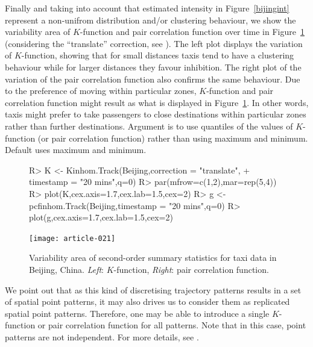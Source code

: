\documentclass[article]{jss}
\begin{document}
  
  Finally and taking into account that estimated intensity in Figure~\ref{bijingint} represent a non-unifrom distribution and/or clustering behaviour, we show the variability area of $K$-function and pair correlation function over time in Figure~\ref{Kgvariation} (considering the ``translate'' correction, see \cite{gabriel2014}). The left plot displays the variation of $K$-function, showing that for small distances taxis tend to have a clustering behaviour while for larger distances they favour inhibition. The right plot of the variation of the pair correlation function also confirms the same behaviour. Due to the preference of moving within particular zones, $K$-function and pair correlation function might result as what is displayed in Figure~\ref{Kgvariation}. In other words, taxis might prefer to take passengers to close destinations within particular zones rather than further destinations. Argument  is to use quantiles of the values of $K$-function (or pair correlation function) rather than using maximum and minimum. Default  uses maximum and minimum.
\begin{figure}[!h]
\begin{center}
\begin{Sinput}
R>   K <- Kinhom.Track(Beijing,correction = "translate",
+                         timestamp = "20 mins",q=0)
R>   par(mfrow=c(1,2),mar=rep(5,4))
R>   plot(K,cex.axis=1.7,cex.lab=1.5,cex=2)
R>   g <- pcfinhom.Track(Beijing,timestamp = "20 mins",q=0)
R>   plot(g,cex.axis=1.7,cex.lab=1.5,cex=2)
\end{Sinput}
\texttt{[image: article-021]}
\end{center}
\caption{Variability area of second-order summary statistics for taxi data in Beijing, China. \emph{Left}: $K$-function, \emph{Right}: pair correlation function.}
\label{Kgvariation}
\end{figure}
  

  We point out that as this kind of discretising trajectory patterns results in a set of spatial point patterns, it may also drives us to consider them as replicated spatial point patterns. Therefore, one may be able to introduce a single $K$-function or pair correlation function for all patterns. Note that in this case, point patterns are not independent. For more details, see \citet[Section 5.4]{D13}.
  
\end{document}
